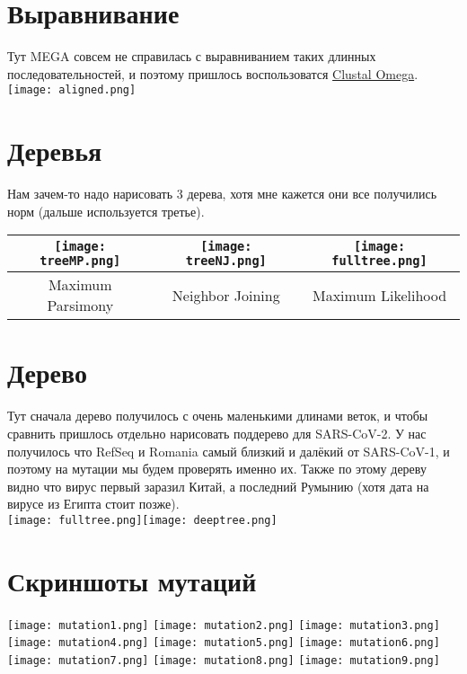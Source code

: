 \documentclass{article}
\begin{document}
  \section{Выравнивание}
  Тут MEGA совсем не справилась с выравниванием таких длинных последовательностей,
  и поэтому пришлось воспользоватся \href{http://www.clustal.org/omega/}{Clustal Omega}. \\
  \texttt{[image: aligned.png]}

  \section{Деревья}
  Нам зачем-то надо нарисовать 3 дерева, хотя мне кажется они все получились норм (дальше используется третье).
  \begin{center}
    \begin{tabular}{|C|C|C|}
      \hline
      \texttt{[image: treeMP.png]} &
      \texttt{[image: treeNJ.png]} &
      \texttt{[image: fulltree.png]} \\\hline
      Maximum Parsimony &
      Neighbor Joining &
      Maximum Likelihood \\\hline
    \end{tabular}
  \end{center}

  \section{Дерево}
  Тут сначала дерево получилось с очень маленькими длинами веток,
  и чтобы сравнить пришлось отдельно нарисовать поддерево для SARS-CoV-2.
  У нас получилось что RefSeq и Romania самый близкий и далёкий от SARS-CoV-1, и поэтому на мутации мы будем проверять именно их.
  Также по этому дереву видно что вирус первый заразил Китай, а последний Румынию (хотя дата на вирусе из Египта стоит позже). \\
  \texttt{[image: fulltree.png]}\texttt{[image: deeptree.png]}

  \section{Скриншоты мутаций}
  \texttt{[image: mutation1.png]}
  \texttt{[image: mutation2.png]}
  \texttt{[image: mutation3.png]} \\
  \texttt{[image: mutation4.png]}
  \texttt{[image: mutation5.png]}
  \texttt{[image: mutation6.png]} \\
  \texttt{[image: mutation7.png]}
  \texttt{[image: mutation8.png]}
  \texttt{[image: mutation9.png]}
\end{document}
